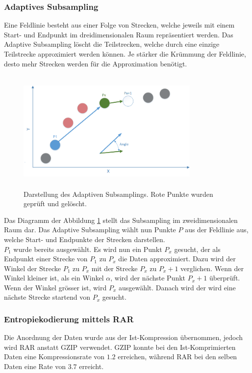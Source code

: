 \subsubsection{Adaptives Subsampling}\label{konzept:loesung0:subsampling}
Eine Feldlinie besteht aus einer Folge von Strecken, welche jeweils mit einem Start- und Endpunkt im dreidimensionalen Raum repräsentiert werden. Das Adaptive Subsampling löscht die Teilstrecken, welche durch eine einzige Teilstrecke approximiert werden können. Je stärker die Krümmung der Feldlinie, desto mehr Strecken werden für die Approximation benötigt.

\begin{figure}[!htbp]
	\center
	\includegraphics[width=0.8\textwidth,height=6cm,keepaspectratio]{./pictures/konzept/solution0/anglesubsampling.png}
	\caption{Darstellung des Adaptiven Subsamplings. Rote Punkte wurden geprüft und gelöscht.}
	\label{konzept:loesung0:angle}
\end{figure}
Das Diagramm der Abbildung \ref{konzept:loesung0:angle} stellt das Subsampling im zweidimensionalen Raum dar. Das Adaptive Subsampling wählt nun Punkte $P$ aus der Feldlinie aus, welche Start- und Endpunkte der Strecken darstellen.\\
$P_1$ wurde bereits ausgewählt. Es wird nun ein Punkt $P_x$ gesucht, der als Endpunkt einer Strecke von $P_1$ zu $P_x$ die Daten approximiert. Dazu wird der Winkel der Strecke $P_1$ zu $P_x$ mit der Strecke $P_x$ zu $P_x+1$ verglichen. Wenn der Winkel kleiner ist, als ein Winkel $\alpha$, wird der nächste Punkt $P_x+1$ überprüft. Wenn der Winkel grösser ist, wird $P_x$ ausgewählt. Danach wird der wird eine nächste Strecke startend von $P_x$ gesucht.

\subsubsection{Entropiekodierung mittels RAR} \label{konzept:loesung0:kodierung}
Die Anordnung der Daten wurde aus der Ist-Kompression übernommen, jedoch wird RAR anstatt GZIP verwendet. GZIP konnte bei den Ist-Komprimierten Daten eine Kompressionsrate von $1.2$ erreichen, während RAR bei den selben Daten eine Rate von $3.7$ erreicht.
\pagebreak

